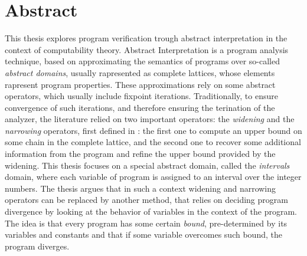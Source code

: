 {}
\begingroup

\chapter*{Abstract}
This thesis explores program verification trough abstract
interpretation in the context of computability theory. Abstract
Interpretation is a program analysis technique, based on approximating
the semantics of programs over so-called \emph{abstract domains},
usually rapresented as complete lattices, whose elements rapresent
program properties. These approximations rely on some abstract
operators, which usually include fixpoint iterations. Traditionally,
to ensure convergence of such iterations, and therefore ensuring the
terination of the analyzer, the literature relied on two important
operators: the \emph{widening} and the \emph{narrowing} operators,
first defined in \cite{patrickradiha:one}: the first one to compute an
upper bound on some chain in the complete lattice, and the second one
to recover some additional information from the program and refine the
upper bound provided by the widening. This thesis focuses on a special
abstract domain, called the \emph{intervals} domain, where each
variable of program is assigned to an interval over the integer
numbers. The thesis argues that in such a context widening and
narrowing operators can be replaced by another method, that relies on
deciding program divergence by looking at the behavior of variables in
the context of the program. The idea is that every program has some
certain \emph{bound}, pre-determined by its variables and constants
and that if some variable overcomes such bound, the program diverges. 

\endgroup

\vfill

